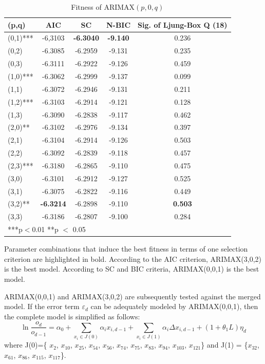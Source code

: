 \documentclass[review,3p,times,12pt,number]{elsarticle}
\begin{document}
\begin{table}[htbp]
\caption{Fitness of ARIMAX$(p,0,q)$}
\center
\label{tab:select-pq}
\begin{tabular} {l c c c c}
\hline
(p,q)    & AIC & SC & N-BIC & Sig. of Ljung-Box Q (18)\\
\hline
(0,1)*** & -6,3103 & \bf{-6.3040} & \bf{-9.140} & 0.236 \\
(0,2)	 &-6.3085	&-6.2959	&-9.131	&0.235\\
(0,3)	 &-6.3111	&-6.2922	&-9.126	&0.459\\
(1,0)***	&-6.3062	&-6.2999	&-9.137	&0.099\\
(1,1)	 &-6.3072	&-6.2946	&-9.131	&0.211\\
(1,2)***	&-6.3103	&-6.2914	&-9.121	&0.128\\
(1,3)	 &-6.3090	&-6.2838	&-9.117	&0.462\\
(2,0)**	 &-6.3102	&-6.2976	&-9.134	&0.397\\
(2,1)	 &-6.3104	&-6.2914	&-9.126	&0.503\\
(2,2)	 &-6.3092	&-6.2839	&-9.118	&0.457\\
(2,3)***	&-6.3180	&-6.2865	&-9.110	&0.475\\
(3,0)	 &-6.3101	&-6.2912	&-9.127	&0.525\\
(3,1)	 &-6.3075	&-6.2822	&-9.116	&0.449\\
(3,2)**	 &\bf{-6.3214}	&-6.2898	&-9.110	&\bf{0.503}\\
(3,3)	 &-6.3186	&-6.2807	&-9.100	&0.284\\
\hline
\multicolumn{5}{l}{***p$<$0.01 **p $<$ 0.05}
\end{tabular}
\end{table}

Parameter combinations that induce the best fitness in terms of one selection criterion are highlighted in bold. According to the AIC criterion, ARIMAX(3,0,2) is the best model. According to SC and BIC criteria, ARIMAX(0,0,1) is the best model.

ARIMAX(0,0,1) and ARIMAX(3,0,2) are subsequently tested against the merged model. If the error term $\varepsilon_d$ can be adequately modeled by ARIMAX(0,0,1), then the complete model is simplified as follows:
\begin{equation}
    \ln \frac{o_d}{o_{d-1}} = \alpha_0 + \sum_{x_i \in J(0)} \alpha_i x_{i,d-1} + \sum_{x_i \in J(1)} \alpha_i \Delta x_{i,d-1} + (1 + \theta_1 L) \eta_d \label{eqn:arima1}
\end{equation}
where J(0)=\{ $x_2$, $x_{10}$, $x_{25}$, $x_{54}$, $x_{56}$, $x_{74}$, $x_{75}$, $x_{83}$, $x_{94}$, $x_{103}$, $x_{121}$\} and J(1) = \{$x_{32}$, $x_{61}$, $x_{86}$, $x_{115}$, $x_{117}$\}.
\end{document}

